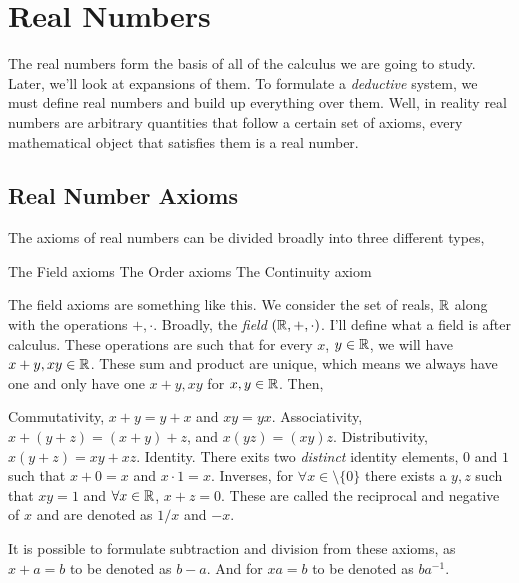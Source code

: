 \chapter{Real Numbers}

The real numbers form the basis of all of the calculus we are going to study. Later, we'll look at expansions of them.
To formulate a \emph{deductive} system, we must define real numbers and build up everything over them. Well, in reality
real numbers are arbitrary quantities that follow a certain set of axioms, every mathematical object that satisfies
them is a real number.

\section{Real Number Axioms}

The axioms of real numbers can be divided broadly into three different types,

\begin{itemize}
    \ii The Field axioms
    \ii The Order axioms
    \ii The Continuity axiom
\end{itemize}

The field axioms are something like this. We consider the set of reals, \(\mathbb R\) along with the operations \(+, \cdot\). Broadly,
the \emph{field} \((\mathbb R, +, \cdot)\). I'll define what a field is after calculus. These operations are such that for every
\(x\), \(y \in \mathbb R\), we will have \(x + y, xy \in \mathbb R\). These sum and product are unique, which means we always have one 
and only have one \(x+y, xy\) for \(x, y \in \mathbb R\). Then,

\begin{itemize}
    \ii Commutativity, \(x+y = y+x\) and \(xy = yx\).
    \ii Associativity, \(x + (y+z) = (x+y) + z\), and \(x(yz) = (xy)z\).
    \ii Distributivity, \(x(y + z) = xy + xz\).
    \ii Identity. There exits two \emph{distinct} identity elements, \(0\) and \(1\) such that \(x + 0 = x\) and \(x \cdot 1 = x\).
    \ii Inverses, for \(\forall x \in \setminus \{0\}\) there exists a \(y, z\) such that \(xy = 1\) and \(\forall x \in \mathbb R\), \(x + z = 0\). These are called the reciprocal 
    and negative of \(x\) and are denoted as \(1/x\) and \(-x\).
\end{itemize}
 
It is possible to formulate subtraction and division from these axioms, as \(x + a = b\) to be denoted as \(b - a\). And for 
\(xa = b\) to be denoted as \(ba^{-1}\). 